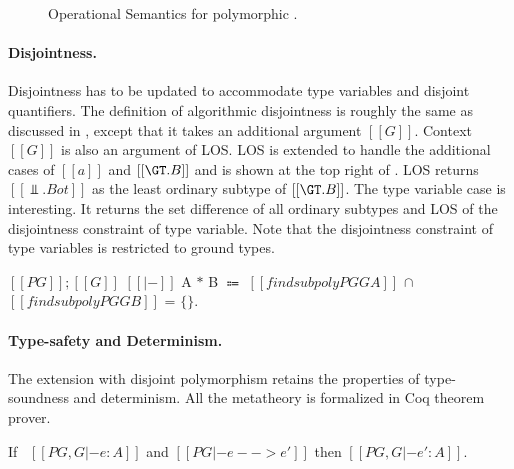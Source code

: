 
\begin{figure}[t]
  \begin{small}
    \centering
  \end{small}
  \caption{Operational Semantics for polymorphic \name.}
  \label{fig:union:poly:red}
\end{figure}


\paragraph*{Disjointness.}
Disjointness has to be updated to accommodate type variables
and disjoint quantifiers. The definition of algorithmic disjointness is
roughly the same as discussed in , except that it
takes an additional argument $[[G]]$.
Context $[[G]]$ is also an argument of LOS.
LOS is extended to handle the additional cases of $[[a]]$ and $[[\GT . B]]$
and is shown at the top right of .
LOS returns $[[\Bot . Bot]]$ as the least ordinary subtype of $[[\GT . B]]$.
The type variable case is interesting. It returns the set difference
of all ordinary subtypes and LOS of the disjointness constraint of type variable.
Note that the disjointness constraint of type variables is restricted to
ground types.

\begin{definition}[Disjointness]
\label{def:poly:ad}
  $[[PG]] ; [[G]]$ $[[|-]]$ A $*$ B $\Coloneqq$  $[[findsubpoly PG G A]]$ $\cap$ $[[findsubpoly PG G B]]$ = $\{\}$.
\end{definition}


\paragraph*{Type-safety and Determinism.}
The extension with disjoint polymorphism retains the properties of type-soundness
and determinism. All the metatheory is formalized in Coq theorem prover.

\begin{theorem}
\label{lemma:union:poly:preservation}
  If \ $[[PG , G |- e : A]]$ and $[[PG |- e --> e']]$ then $[[PG , G |- e' : A]]$.
\end{theorem}

